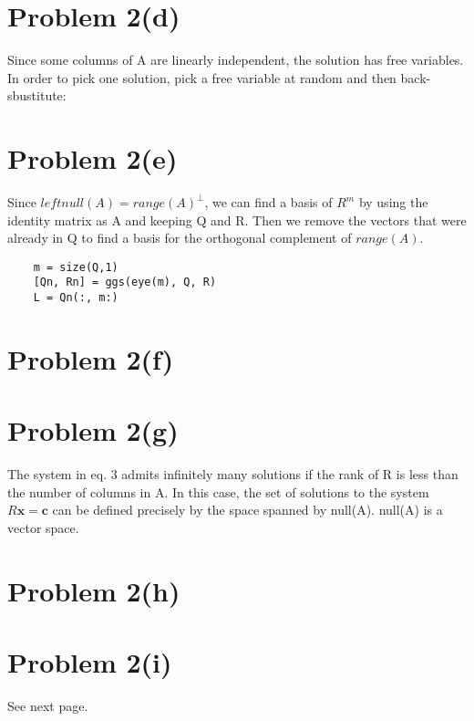 \documentclass{article}
\begin{document}
\section*{Problem 2(d)}

Since some columns of A are linearly independent, the solution has free variables. In order to pick one solution, pick a free variable at random and then back-sbustitute:

\section*{Problem 2(e)}

Since $leftnull(A) = range(A)^{\perp}$, we can find a basis of $R^m$ by using the identity matrix as A and keeping Q and R. Then we remove the vectors that were already in Q to find a basis for the orthogonal complement of $range(A)$.

\begin{verbatim}
    m = size(Q,1)
    [Qn, Rn] = ggs(eye(m), Q, R)
    L = Qn(:, m:)
\end{verbatim}

\section*{Problem 2(f)}


\section*{Problem 2(g)}

The system in eq. 3 admits infinitely many solutions if the rank of R is less than the number of columns in A. In this case, the set of solutions to the system $R\mathbf{x}=\mathbf{c}$ can be defined precisely by the space spanned by null(A). null(A) is a vector space.

\section*{Problem 2(h)}


\section*{Problem 2(i)}

See next page.

\end{document}
